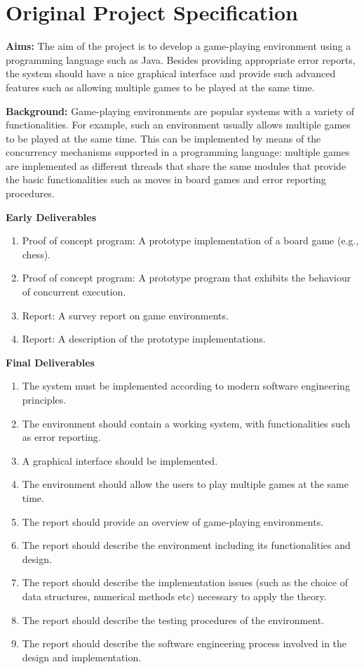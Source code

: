 \documentclass[]{final}
\begin{document}
\newpage

\section{Original Project Specification}

\textbf{Aims:} The aim of the project is to develop a game-playing environment
using a programming language such as Java. Besides providing appropriate error reports,
the system should have a nice graphical interface and provide such advanced
features such as allowing multiple games to be played at the same time.

\textbf{Background:} Game-playing environments are popular systems with a
variety of functionalities. For example, such an environment usually allows
multiple games to be played at the same time. This can be implemented by means
of the concurrency mechanisms supported in a programming language: multiple games
are implemented as different threads that share the same modules that provide
the basic functionalities such as moves in board games and error reporting procedures.

\textbf{Early Deliverables}
\begin{enumerate}
  \item Proof of concept program: A prototype implementation of a board game (e.g., chess).
  \item Proof of concept program: A prototype program that exhibits the behaviour of concurrent execution.
  \item Report: A survey report on game environments.
  \item Report: A description of the prototype implementations.
\end{enumerate}

\textbf{Final Deliverables}
\begin{enumerate}
  \item The system must be implemented according to modern software engineering principles.
  \item The environment should contain a working system, with functionalities such as error reporting.
  \item A graphical interface should be implemented.
  \item The environment should allow the users to play multiple games at the same time.
  \item The report should provide an overview of game-playing environments.
  \item The report should describe the environment including its functionalities and design.
  \item The report should describe the implementation issues (such as the choice of data structures, numerical methods etc) necessary to apply the theory.
  \item The report should describe the testing procedures of the environment.
  \item The report should describe the software engineering process involved in the design and implementation.
\end{enumerate}
\end{document}

